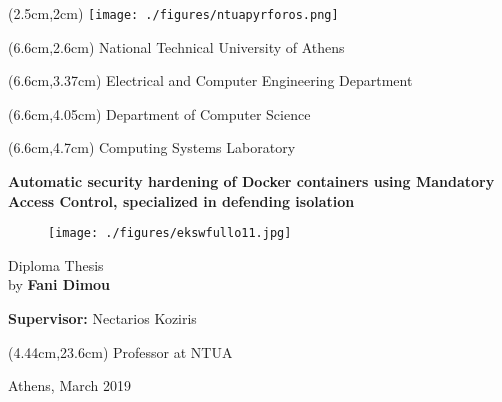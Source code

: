 \thispagestyle{empty}
\begin{textblock*}{6cm}(2.5cm,2cm) %
\texttt{[image: ./figures/ntuapyrforos.png]}
\end{textblock*}

\begingroup
 
\begin{mdseries}  
\begin{textblock*}{103cm}(6.6cm,2.6cm) %
\fontsize{16}{12}\selectfont 
National Technical University of Athens
\end{textblock*}
\fontsize{14}{12}\selectfont
\begin{textblock*}{103cm}(6.6cm,3.37cm)
Electrical and Computer Engineering Department
\end{textblock*}
\begin{textblock*}{103cm}(6.6cm,4.05cm)
Department of Computer Science
\end{textblock*}
\begin{textblock*}{103cm}(6.6cm,4.7cm)
Computing Systems Laboratory
\end{textblock*}

\hfill\break\hfill\break\hfill\break\hfill\break\hfill\break\hfill\break\hfill\break\hfill\break

\fontsize{18}{12}\selectfont
\begin{center}\textbf{Automatic security hardening of Docker containers using Mandatory Access Control, specialized in defending isolation}\end{center}
\hfill\break
\begin{figure}[h!]
  \centering
   \texttt{[image: ./figures/ekswfullo11.jpg]}
\end{figure}
\hfill\break
\fontsize{17}{20.5}\selectfont

\begin{center}
Diploma Thesis
\\
by \textbf{Fani Dimou}
\end{center}

\hfill\break

\hfill\break\hfill\break
\fontsize{13}{12}\selectfont
\textbf{Supervisor:} Nectarios Koziris
\begin{textblock*}{103cm}(4.44cm,23.6cm)
Professor at NTUA
\end{textblock*}

\hfill\break\hfill\break\hfill\break
\begin{center}
Athens, March 2019
\end{center}

\end{mdseries}
\endgroup

\clearpage\null\thispagestyle{empty}
\newpage

